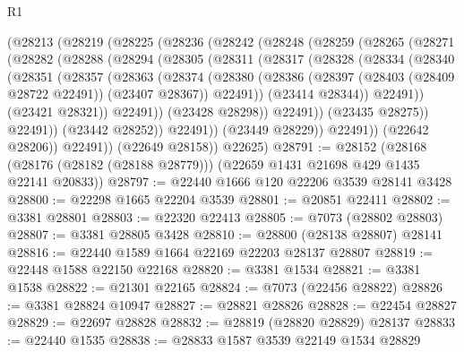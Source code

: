 \begin{lexlean}{R1}
\begin{coremodule}
      (@28213
        (@28219
          (@28225
            (@28236
              (@28242
                (@28248
                  (@28259
                    (@28265
                      (@28271
                        (@28282
                          (@28288
                            (@28294
                              (@28305
                                (@28311
                                  (@28317
                                    (@28328
                                      (@28334
                                        (@28340
                                          (@28351
                                            (@28357
                                              (@28363
                                                (@28374
                                                  (@28380
                                                    (@28386
                                                      (@28397
                                                        (@28403 (@28409 @28722 @22491))
                                                        (@23407 @28367))
                                                      @22491))
                                                  (@23414 @28344))
                                                @22491))
                                            (@23421 @28321))
                                          @22491))
                                      (@23428 @28298))
                                    @22491))
                                (@23435 @28275))
                              @22491))
                          (@23442 @28252))
                        @22491))
                    (@23449 @28229))
                  @22491))
              (@22642 @28206))
            @22491))
        (@22649 @28158))
      @22625)
@28791 := @28152
    (@28168 (@28176 (@28182 (@28188 @28779))) (@22659 @1431 @21698 @429 @1435 @22141 @20833))
@28797 := @22440 @1666 @120 @22206 @3539 @28141 @3428
@28800 := @22298 @1665 @22204 @3539
@28801 := @20851 @22411
@28802 := @3381 @28801
@28803 := @22320 @22413
@28805 := @7073 (@28802 @28803)
@28807 := @3381 @28805 @3428
@28810 := @28800 (@28138 @28807) @28141
@28816 := @22440 @1589 @1664 @22169 @22203 @28137 @28807
@28819 := @22448 @1588 @22150 @22168
@28820 := @3381 @1534
@28821 := @3381 @1538
@28822 := @21301 @22165
@28824 := @7073 (@22456 @28822)
@28826 := @3381 @28824 @10947
@28827 := @28821 @28826
@28828 := @22454 @28827
@28829 := @22697 @28828
@28832 := @28819 (@28820 @28829) @28137
@28833 := @22440 @1535
@28838 := @28833 @1587 @3539 @22149 @1534 @28829

\end{coremodule}
\end{lexlean}
